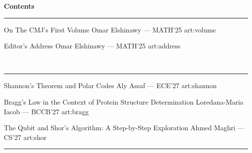 \documentclass[11pt, twoside, a4paper]{article}
\begin{document}



\clearpage
\thispagestyle{frontmatter}
\vspace*{1.5cm}
\begin{center}
  {\LARGE\bfseries\color{cmjcrimson}Contents}
\end{center}
\vspace{0.3cm}
\noindent\textcolor{cmjgold}{\rule{\textwidth}{1.2pt}}
\vspace{0.3cm}

\contentsentry
  {On The CMJ's First Volume}
  {Omar Elshinawy --- MATH'25}
  {art:volume}

\contentsentry
  {Editor's Address}
  {Omar Elshinawy --- MATH'25}
  {art:address}

\vspace{0.4cm}
\\[-0.4cm]
\noindent\textcolor{cmjgold}{\rule{\textwidth}{0.8pt}}\vspace{0.6cm}


\vspace{0.6cm}

\contentsentry
  {Shannon's Theorem and Polar Codes}
  {Aly Assaf --- ECE'27}
  {art:shannon}

\contentsentry
  {Bragg's Law in the Context of Protein Structure Determination}
  {Loredana-Maria Iacob --- BCCB'27}
  {art:bragg}

\contentsentry
  {The Qubit and Shor's Algorithm: A Step-by-Step Exploration}
  {Ahmed Maghri --- CS'27}
  {art:shor}

\vfill
\noindent\textcolor{cmjgold}{\rule{\textwidth}{1.2pt}}

\clearpage
{}










\end{document}
